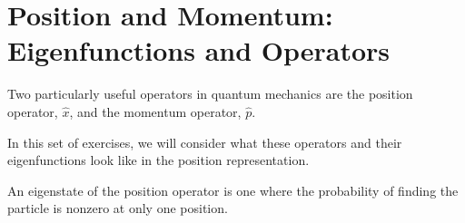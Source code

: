 \section*{Position and Momentum: Eigenfunctions and Operators}

	Two particularly useful operators in quantum mechanics are the position operator, $\hat x$, and the momentum operator, $\hat p$.
	
	In this set of exercises, we will consider what these operators and their eigenfunctions look like in the position representation.
	
	\vspace{0.25in}
	
	\begin{questions}
		\question An eigenstate of the position operator is one where the probability of finding the particle is nonzero at only one position.
		
			

\end{questions}
